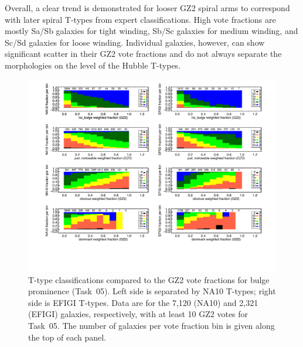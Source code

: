 \documentclass[useAMS,usenatbib]{mn2e}
\begin{document}
Overall, a clear trend is demonstrated for looser GZ2 spiral arms to correspond with later spiral T-types from expert classifications. High vote fractions are mostly Sa/Sb galaxies for tight winding, Sb/Sc galaxies for medium winding, and Sc/Sd galaxies for loose winding. Individual galaxies, however, can show significant scatter in their GZ2 vote fractions and do not always separate the morphologies on the level of the Hubble T-types. 

\begin{figure}
\includegraphics[angle=0,width=7.0in]{figures/bulgeprominence_color.pdf}
\caption{T-type classifications compared to the GZ2 vote fractions for bulge prominence (Task~05). Left side is separated by NA10 T-types; right side is EFIGI T-types. Data are for the 7,120 (NA10) and 2,321 (EFIGI) galaxies, respectively, with at least 10 GZ2 votes for Task~05. The number of galaxies per vote fraction bin is given along the top of each panel. 
\label{fig-bulgeprominence}}
\end{figure}
\end{document}

